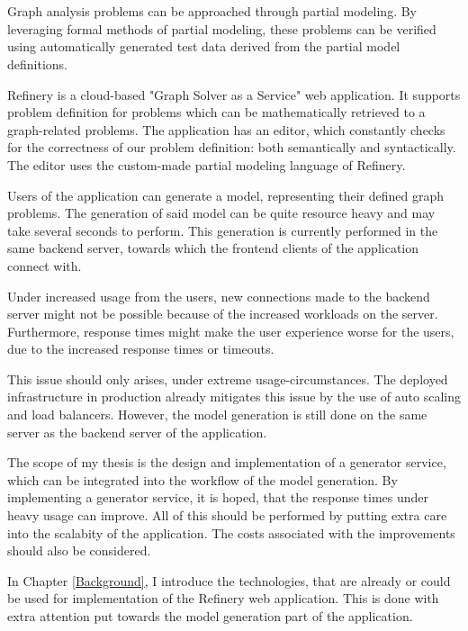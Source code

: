 \chapter{\bevezetes}

Graph analysis problems can be approached through partial modeling. By leveraging
formal methods of partial modeling, these problems can be verified using automatically
generated test data derived from the partial model definitions.

Refinery is a cloud-based "Graph Solver as a Service" web application. It supports problem
definition for problems which can be mathematically retrieved to a graph-related problems.
The application has an editor, which constantly checks for the correctness of our problem definition:
both semantically and syntactically. The editor uses the custom-made partial modeling language of Refinery.

Users of the application can generate a model, representing their defined graph problems. The generation of 
said model can be quite resource heavy and may take several seconds to perform. 
This generation is currently performed in the same backend server, towards which the frontend clients of the application
connect with. 

Under increased usage from the users, new connections made to the backend server might not be possible because of 
the increased workloads on the server. Furthermore, response times might make the user experience worse for the users, due to the increased response
times or timeouts.

This issue should only arises, under extreme usage-circumstances. The deployed infrastructure in production already mitigates this issue by 
the use of auto scaling and load balancers. However, the model generation is still done on the same server as the backend server of 
the application.

The scope of my thesis is the design and implementation of a generator service, which can be integrated into the workflow of the model generation.
By implementing a generator service, it is hoped, that the response times under heavy usage can improve. All of this should be performed by 
putting extra care into the scalabity of the application. The costs associated with the improvements should also be considered.

In Chapter \ref{Background}, I introduce the technologies, that are already or could be used for implementation of the Refinery web application.
This is done with extra attention put towards the model generation part of the application.


